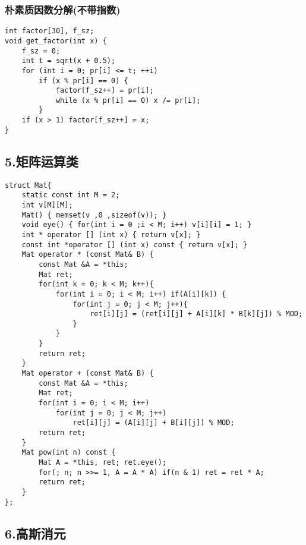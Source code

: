 \documentclass[]{article}
\begin{document}
\hypertarget{ux6734ux7d20ux8d28ux56e0ux6570ux5206ux89e3ux4e0dux5e26ux6307ux6570}{%
\subsubsection{朴素质因数分解(不带指数)}\label{ux6734ux7d20ux8d28ux56e0ux6570ux5206ux89e3ux4e0dux5e26ux6307ux6570}}

\begin{verbatim}
int factor[30], f_sz;
void get_factor(int x) {
    f_sz = 0;
    int t = sqrt(x + 0.5);
    for (int i = 0; pr[i] <= t; ++i)
        if (x % pr[i] == 0) {
            factor[f_sz++] = pr[i];
            while (x % pr[i] == 0) x /= pr[i];
        }
    if (x > 1) factor[f_sz++] = x;
}
\end{verbatim}

\hypertarget{ux77e9ux9635ux8fd0ux7b97ux7c7b}{%
\subsection{5.矩阵运算类}\label{ux77e9ux9635ux8fd0ux7b97ux7c7b}}

\begin{verbatim}
struct Mat{
    static const int M = 2;
    int v[M][M];
    Mat() { memset(v ,0 ,sizeof(v)); }
    void eye() { for(int i = 0 ;i < M; i++) v[i][i] = 1; }
    int * operator [] (int x) { return v[x]; }
    const int *operator [] (int x) const { return v[x]; }
    Mat operator * (const Mat& B) {
        const Mat &A = *this;
        Mat ret;
        for(int k = 0; k < M; k++){
            for(int i = 0; i < M; i++) if(A[i][k]) {
                for(int j = 0; j < M; j++){
                    ret[i][j] = (ret[i][j] + A[i][k] * B[k][j]) % MOD;
                }
            }
        }
        return ret;
    }
    Mat operator + (const Mat& B) {
        const Mat &A = *this;
        Mat ret;
        for(int i = 0; i < M; i++)
            for(int j = 0; j < M; j++)
                ret[i][j] = (A[i][j] + B[i][j]) % MOD;
        return ret;
    }
    Mat pow(int n) const {
        Mat A = *this, ret; ret.eye();
        for(; n; n >>= 1, A = A * A) if(n & 1) ret = ret * A;
        return ret;
    }
};
\end{verbatim}

\hypertarget{ux9ad8ux65afux6d88ux5143}{%
\subsection{6.高斯消元}\label{ux9ad8ux65afux6d88ux5143}}
\end{document}

